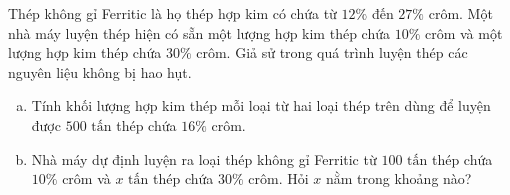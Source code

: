 

\begin{bt}%
Thép không gỉ Ferritic là họ thép hợp kim có chứa từ $12\%$ đến $27\%$ crôm. Một nhà máy luyện thép hiện có sẵn một lượng hợp kim thép chứa $10\%$ crôm và một lượng hợp kim thép chứa $30\%$ crôm. Giả sử trong quá trình luyện thép các nguyên liệu không bị hao hụt.
\begin{enumerate}[a)]
	\item Tính khối lượng hợp kim thép mỗi loại từ hai loại thép trên dùng để luyện được $500\text{ tấn}$ thép chứa $16\%$ crôm.
	\item Nhà máy dự định luyện ra loại thép không gỉ Ferritic từ $100\text{ tấn}$ thép chứa $10\%$ crôm và $x\text{ tấn}$ thép chứa $30\%$ crôm. Hỏi $x$ nằm trong khoảng nào?
\end{enumerate}
\end{bt}
